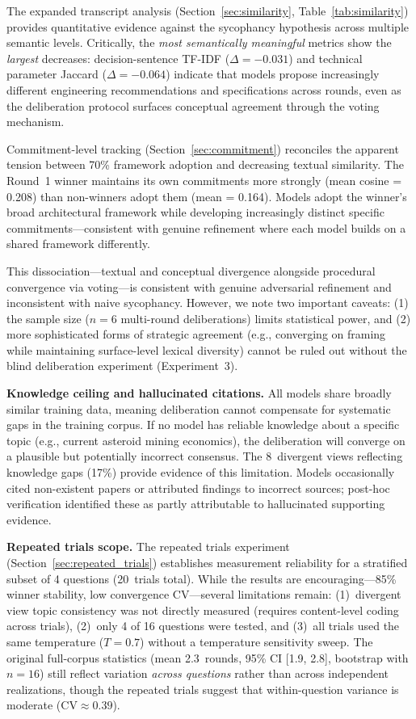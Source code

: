 \documentclass[11pt,a4paper]{article}
\begin{document}
The expanded transcript analysis (Section~\ref{sec:similarity}, Table~\ref{tab:similarity}) provides quantitative evidence against the sycophancy hypothesis across multiple semantic levels. Critically, the \emph{most semantically meaningful} metrics show the \emph{largest} decreases: decision-sentence TF-IDF ($\Delta = -0.031$) and technical parameter Jaccard ($\Delta = -0.064$) indicate that models propose increasingly different engineering recommendations and specifications across rounds, even as the deliberation protocol surfaces conceptual agreement through the voting mechanism.

Commitment-level tracking (Section~\ref{sec:commitment}) reconciles the apparent tension between 70\% framework adoption and decreasing textual similarity. The Round~1 winner maintains its own commitments more strongly (mean cosine = 0.208) than non-winners adopt them (mean = 0.164). Models adopt the winner's broad architectural framework while developing increasingly distinct specific commitments---consistent with genuine refinement where each model builds on a shared framework differently.

This dissociation---textual and conceptual divergence alongside procedural convergence via voting---is consistent with genuine adversarial refinement and inconsistent with naive sycophancy. However, we note two important caveats: (1) the sample size ($n = 6$ multi-round deliberations) limits statistical power, and (2) more sophisticated forms of strategic agreement (e.g., converging on framing while maintaining surface-level lexical diversity) cannot be ruled out without the blind deliberation experiment (Experiment~3).

\textbf{Knowledge ceiling and hallucinated citations.} All models share broadly similar training data, meaning deliberation cannot compensate for systematic gaps in the training corpus. If no model has reliable knowledge about a specific topic (e.g., current asteroid mining economics), the deliberation will converge on a plausible but potentially incorrect consensus. The 8~divergent views reflecting knowledge gaps (17\%) provide evidence of this limitation. Models occasionally cited non-existent papers or attributed findings to incorrect sources; post-hoc verification identified these as partly attributable to hallucinated supporting evidence.

\textbf{Repeated trials scope.} The repeated trials experiment (Section~\ref{sec:repeated_trials}) establishes measurement reliability for a stratified subset of 4 questions (20~trials total). While the results are encouraging---85\% winner stability, low convergence CV---several limitations remain: (1)~divergent view topic consistency was not directly measured (requires content-level coding across trials), (2)~only 4 of 16 questions were tested, and (3)~all trials used the same temperature ($T = 0.7$) without a temperature sensitivity sweep. The original full-corpus statistics (mean 2.3~rounds, 95\% CI [1.9, 2.8], bootstrap with $n = 16$) still reflect variation \emph{across questions} rather than across independent realizations, though the repeated trials suggest that within-question variance is moderate ($\text{CV} \approx 0.39$).
\end{document}
